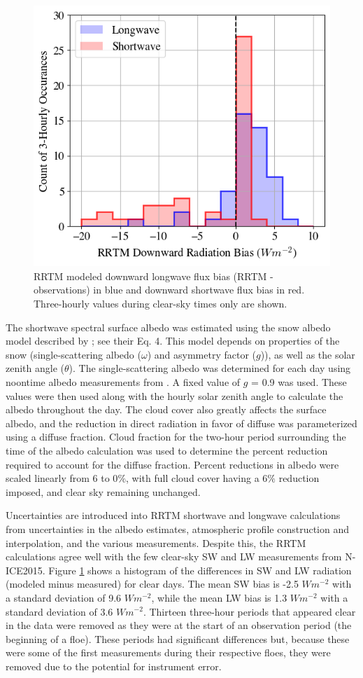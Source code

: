 \begin{figure}[b!]
    \centering
    \includegraphics[width=0.65\linewidth]{figures/chapter4/RRTMcorrelation_bias.png}
    \caption[RRTM modeled downward flux bias histogram.]{RRTM modeled downward longwave flux bias (RRTM - observations) in blue and downward shortwave flux bias in red. Three-hourly values during clear-sky times only are shown.}
    \label{fig:rrtm}
\end{figure}

The shortwave spectral surface albedo was estimated using the snow albedo model described by \citet{wiscombe:1980}; see their Eq. 4. This model depends on properties of the snow (single-scattering albedo ($\omega$) and asymmetry factor ($g$)), as well as the solar zenith angle ($\theta$). The single-scattering albedo was determined for each day using noontime albedo measurements from \citet{walden:2017}. A fixed value of $g$ = 0.9 was used. These values were then used along with the hourly solar zenith angle to calculate the albedo throughout the day. The cloud cover also greatly affects the surface albedo, and the reduction in direct radiation in favor of diffuse was parameterized using a diffuse fraction. Cloud fraction for the two-hour period surrounding the time of the albedo calculation was used to determine the percent reduction required to account for the diffuse fraction. Percent reductions in albedo were scaled linearly from 6 to 0$\%$, with full cloud cover having a 6$\%$ reduction imposed, and clear sky remaining unchanged.

Uncertainties are introduced into RRTM shortwave and longwave calculations from uncertainties in the albedo estimates, atmospheric profile construction and interpolation, and the various measurements. Despite this, the RRTM calculations agree well with the few clear-sky SW and LW measurements from N-ICE2015. Figure \ref{fig:rrtm} shows a histogram of the differences in SW and LW radiation (modeled minus measured) for clear days. The mean SW bias is -2.5 $W m^{-2}$ with a standard deviation of 9.6 $W m^{-2}$, while the mean LW bias is 1.3 $W m^{-2}$ with a standard deviation of 3.6 $W m^{-2}$. Thirteen three-hour periods that appeared clear in the data were removed as they were at the start of an observation period (the beginning of a floe). These periods had significant differences but, because these were some of the first measurements during their respective floes, they were removed due to the potential for instrument error.


